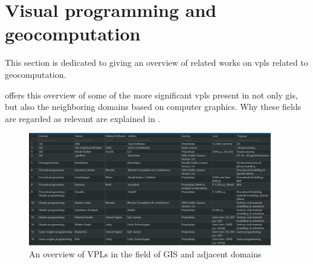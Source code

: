 
\section{Visual programming and geocomputation}
\label{sec:related-geovpl}

This section is dedicated to giving an overview of related works on \ac{vpl}s related to geocomputation.

\begin{note}
\end{note}

 offers this overview of some of the more significant \ac{vpl}s present in not only \ac{gis}, but also the neighboring domains based on computer graphics.
Why these fields are regarded as relevant are explained in . 

\begin{figure}
  \centering
  \graphicspath{ {../../assets/tables/} }
  \includegraphics[width=400px]{geovpl.png}
  \caption{An overview of VPLs in the field of GIS and adjacent domains}
  \label{fig:geovpl:table}
\end{figure}

